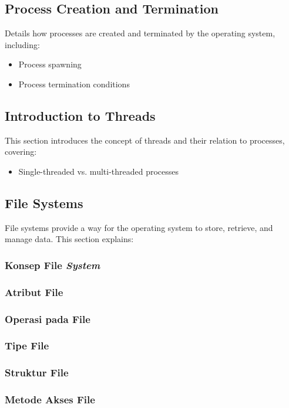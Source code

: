 \documentclass[12pt]{article}
\begin{document}
\subsection{Process Creation and Termination}
Details how processes are created and terminated by the operating system, including:
\begin{itemize}
    \item Process spawning
    \item Process termination conditions
\end{itemize}

\subsection{Introduction to Threads}
This section introduces the concept of threads and their relation to processes, covering:
\begin{itemize}
    \item Single-threaded vs. multi-threaded processes
\end{itemize}
\subsection{File Systems}
File systems provide a way for the operating system to store, retrieve, and manage data. This section explains:
\subsubsection{Konsep File \textit{System}}
\subsubsection{Atribut File}
\subsubsection{Operasi pada File}
\subsubsection{Tipe File}
\subsubsection{Struktur File}
\subsubsection{Metode Akses File}
\end{document}
